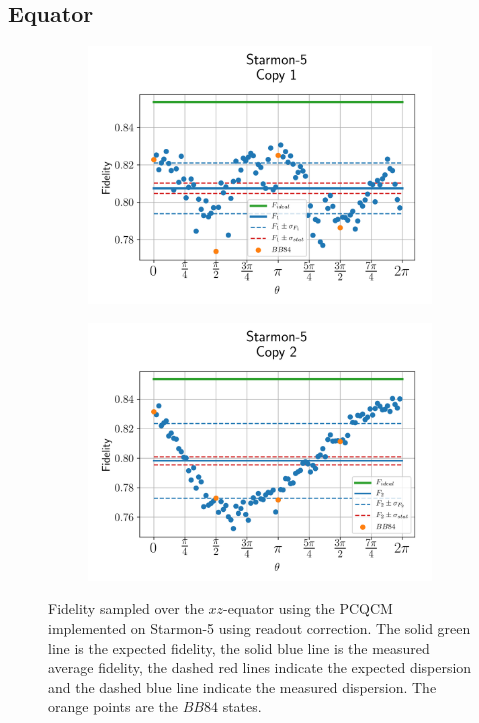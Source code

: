 \subsection{Equator}


\begin{figure}[H]
    \centering
    \begin{subfigure}{.5\textwidth}
      \centering
      \includegraphics[width=\textwidth]{Figures/PhaseCovariant/Starmon/OnlyEquator/results_starmon_copy1.png}
      \label{fig:pc_uncorrected_starmon_equator_1}
    \end{subfigure}%
    \begin{subfigure}{.5\textwidth}
      \centering
      \includegraphics[width=\textwidth]{Figures/PhaseCovariant/Starmon/OnlyEquator/results_starmon_copy2.png}
      \label{fig:pc_uncorrected_starmon_equator_2}
    \end{subfigure}
    \vspace{-0.5cm}
    \caption{Fidelity sampled over the $xz$-equator using the PCQCM implemented on Starmon-5 using readout correction.
    The solid green line is the expected fidelity, the solid blue line is the measured average fidelity, the dashed red lines indicate the expected dispersion and the dashed blue line indicate the measured dispersion. The orange points are the $BB84$ states.}
    \label{fig:pc_uncorrected_starmon_equator}
  \end{figure}
  
